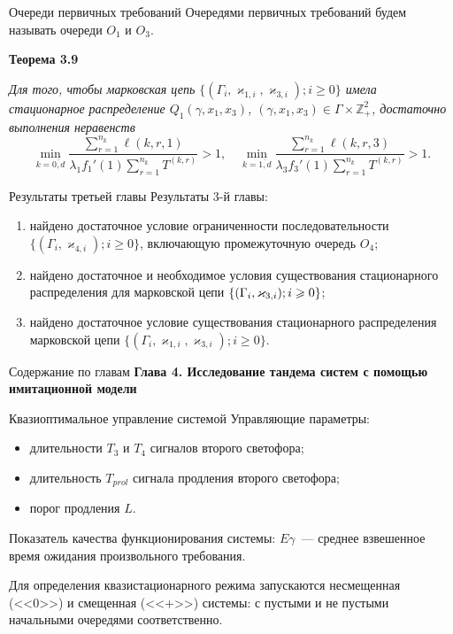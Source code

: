 \documentclass[10pt]{beamer}
\newcommand*{\hm}[1]{#1\nobreak\discretionary{}%
	{\hbox{$\mathsurround=0pt #1$}}{}}%
\newcommand{\MarkThree}{\{(\Gamma_i, \varkappa_{3,i}); \hm{} i \geqslant 0\}}
\begin{document}
\begin{frame}{Очереди первичных требований}
Очередями первичных требований будем называть очереди $O_1$ и $O_3$.
\vfill

 {\bf Теорема 3.9}
{\it 
Для того, чтобы марковская цепь $\{(\Gamma_i, \varkappa_{1,i},\varkappa_{3,i}); i \geqslant 0\}$ имела стационарное распределение $Q_1(\gamma,x_1,x_3)$, $(\gamma,x_1,x_3)\in \Gamma \times {\mathbb Z}^2_+$, достаточно выполнения неравенств
\begin{equation}
\min_{k=\overline{0,d}} { \frac{\sum_{r = 1}^{n_k} \ell(k,r,1) }{\lambda_1 f_1'(1) \sum_{r=1}^{n_k} T^{(k,r)} }}>1, \quad 
\min_{k=\overline{1,d}} { \frac{\sum_{r = 1}^{n_k} \ell(k,r,3) }{\lambda_3 f_3'(1) \sum_{r=1}^{n_k} T^{(k,r)} }}>1.
\label{sufficient:double}
\end{equation}

}
\end{frame}


\begin{frame}{Результаты третьей главы}
Результаты 3-й главы:
\begin{enumerate}
    \item найдено достаточное условие ограниченности последовательности $\{(\Gamma_i, \varkappa_{4,i}); i \geqslant 0\}$, включающую промежуточную очередь $O_4$;
    \item найдено достаточное и необходимое условия существования стационарного распределения для марковской цепи $\MarkThree$;
    \item найдено достаточное условие существования стационарного распределения марковской цепи $\{(\Gamma_i, \varkappa_{1,i},\varkappa_{3,i}); i \geqslant 0\}$.
\end{enumerate}

\end{frame}


  \begin{frame}{Содержание по главам}
  \Large{\textbf{Глава 4. Исследование тандема систем с помощью имитационной модели}}\par
\end{frame}

\begin{frame}{Квазиоптимальное управление системой}
    Управляющие параметры:
    
    \begin{itemize}
        \item длительности $T_3$ и $T_4$ сигналов второго светофора;
        \item длительность $T_{prol}$ сигнала продления второго светофора;
        \item порог продления $L$.
    \end{itemize}
    
    Показатель качества функционирования системы: $E \gamma$~--- среднее взвешенное время ожидания произвольного требования.
    
    Для определения квазистационарного режима запускаются несмещенная (<<0>>) и смещенная (<<+>>) системы: с пустыми и не пустыми начальными очередями соответственно. 
\end{frame}
\end{document}
